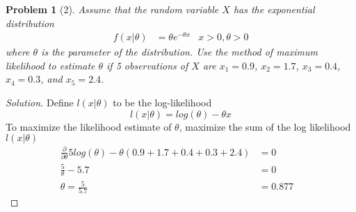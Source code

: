 \documentclass[11pt]{article}
\theoremstyle{quest}
\newtheorem*{problem}{Problem}
\newenvironment{solution}
  {\begin{mdframed}\begin{proof}[Solution]}
  {\end{proof}\end{mdframed}}
\begin{document}
\begin{problem}[2]
Assume that the random variable $X$ has the exponential distribution
\begin{align*}
    f(x|\theta) &= \theta e^{-\theta x} & x > 0, \theta > 0
\end{align*}
where $\theta$ is the parameter of the distribution. Use the method of maximum likelihood to estimate $\theta$ if 5 observations of $X$ are $x_1 = 0.9$, $x_2 = 1.7$, $x_3 = 0.4$, $x_4 = 0.3$, and $x_5 = 2.4$.
\end{problem}
\begin{solution}
    Define $l(x|\theta)$ to be the log-likelihood 
    \[
        l(x|\theta) = log(\theta) - \theta x
    \]
    To maximize the likelihood estimate of $\theta$, maximize the sum of the log likelihood $l(x|\theta)$
    \begin{align*}
    \frac{\partial }{\partial \theta} 5 log(\theta) - \theta(0.9 + 1.7 + 0.4 + 0.3 + 2.4) &= 0 &\\
    \frac{5}{\theta} - 5.7 &= 0 &\\
    \theta = \frac{5}{5.7} &= 0.877
    \end{align*}
    
\end{solution}
\end{document}
